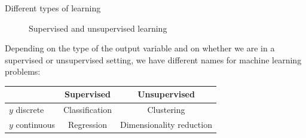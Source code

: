 \documentclass[xcolor=pdftex,dvipsnames,table]{beamer}
\begin{document}
\begin{frame}{Different types of learning}
	 \begin{figure}[htb]
   		\centering
   		 \hspace{1cm}
   		\caption{Supervised and unsupervised learning}
	 \end{figure}
	Depending on the type of the output variable and on whether we are in a supervised or unsupervised setting, we have different names for machine learning problems: 
	\begin{table}
	\begin{tabular}{|l || c | c | }
		\hline
 		& Supervised & Unsupervised \\
		\hline \hline
		$y$ discrete & Classification & Clustering \\
		$y$ continuous & Regression & Dimensionality reduction\\
		\hline
	\end{tabular}
	\end{table}
\end{frame}
\end{document}

